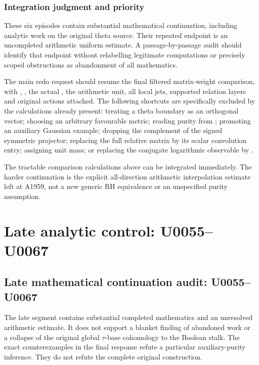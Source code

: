 \documentclass[10pt,a4paper,oneside]{report}
\begin{document}
\subsection{Integration judgment and
priority}\label{integration-judgment-and-priority}

These six episodes contain substantial mathematical continuation,
including analytic work on the original theta source. Their repeated
endpoint is an uncompleted arithmetic uniform estimate. A
passage-by-passage audit should identify that endpoint without
relabelling legitimate computations or precisely scoped obstructions as
abandonment of all mathematics.

The main redo request should resume the final filtered matrix-weight
comparison, with \protect{}, \protect{}, the actual
\protect{}, the arithmetic unit, all local jets, supported
relation layers and original actions attached. The following shortcuts
are specifically excluded by the calculations already present: treating
a theta boundary as an orthogonal vector; choosing an arbitrary
favourable metric; reading purity from \protect{}; promoting
an auxiliary Gaussian example; dropping the complement of the signed
symmetric projector; replacing the full relative matrix by its scalar
convolution entry; assigning unit mass; or replacing the conjugate
logarithmic observable by \protect{}.

The tractable comparison calculations above can be integrated
immediately. The harder continuation is the explicit all-direction
arithmetic interpolation estimate left at A1959, not a new generic RH
equivalence or an unspecified purity assumption.

\clearpage

\chapter{Late analytic control:
U0055--U0067}\label{late-analytic-control-u0055u0067}

\section{Late mathematical continuation audit:
U0055--U0067}\label{late-mathematical-continuation-audit-u0055u0067}

The late segment contains substantial completed mathematics and an
unresolved arithmetic estimate. It does not support a blanket finding of
abandoned work or a collapse of the original global
\allowbreak{}\ensuremath{τ}\allowbreak{}-base cohomology to the Boolean
stalk. The exact counterexamples in the final response refute a
particular auxiliary-purity inference. They do not refute the complete
original construction.
\end{document}
